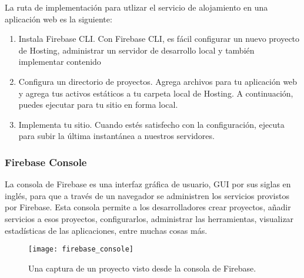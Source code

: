 La ruta de implementación para utlizar el servicio de alojamiento 
en una aplicación web es la siguiente:

\begin{enumerate}
\item {} 
Instala Firebase CLI. Con Firebase CLI, es fácil configurar un nuevo proyecto de Hosting, administrar un servidor de desarrollo local y también implementar contenido

\item {} 
Configura un directorio de proyectos. Agrega archivos para tu aplicación web y agrega tus activos estáticos a tu carpeta local de Hosting. A continuación, puedes ejecutar  para tu sitio en forma local.

\item {} 
Implementa tu sitio. Cuando estés satisfecho con la configuración, ejecuta  para subir la última instantánea a nuestros servidores.

\end{enumerate}


\subsubsection{Firebase Console}

La consola de Firebase es una interfaz gráfica de usuario, GUI por sus 
siglas en inglés, para que a través de un navegador se administren
los servicios provistos por Firebase. Esta consola permite a los desarrolladores
crear proyectos, añadir servicios a esos proyectos,
configurarlos, administrar las herramientas, visualizar estadísticas
de las aplicaciones, entre muchas cosas más.

\begin{figure}[ht]
\centering
\caption{Una captura de un proyecto visto desde la consola
de Firebase.}
\texttt{[image: firebase\_console]}
\end{figure}
